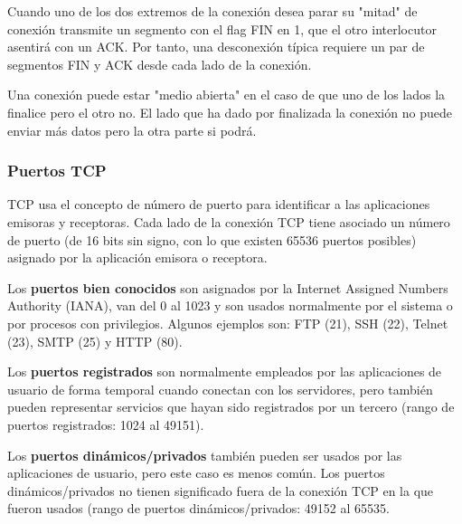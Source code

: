 Cuando uno de los dos extremos de la conexión desea parar su "mitad" de conexión transmite un segmento con el flag FIN en 1, que el otro interlocutor asentirá con un ACK. Por tanto, una desconexión típica requiere un par de segmentos FIN y ACK desde cada lado de la conexión.

Una conexión puede estar "medio abierta" en el caso de que uno de los lados la finalice pero el otro no. El lado que ha dado por finalizada la conexión no puede enviar más datos pero la otra parte si podrá.



\subsubsection{Puertos TCP}
TCP usa el concepto de número de puerto para identificar a las aplicaciones emisoras y receptoras. Cada lado de la conexión TCP tiene asociado un número de puerto (de 16 bits sin signo, con lo que existen 65536 puertos posibles) asignado por la aplicación emisora o receptora.

Los \textbf{puertos bien conocidos} son asignados por la Internet Assigned Numbers Authority (IANA), van del 0 al 1023 y son usados normalmente por el sistema o por procesos con privilegios. Algunos ejemplos son: FTP (21), SSH (22), Telnet (23), SMTP (25) y HTTP (80).

Los \textbf{puertos registrados} son normalmente empleados por las aplicaciones de usuario de forma temporal cuando conectan con los servidores, pero también pueden representar servicios que hayan sido registrados por un tercero (rango de puertos registrados: 1024 al 49151).

Los \textbf{puertos dinámicos/privados} también pueden ser usados por las aplicaciones de usuario, pero este caso es menos común. Los puertos dinámicos/privados no tienen significado fuera de la conexión TCP en la que fueron usados (rango de puertos dinámicos/privados: 49152 al 65535.